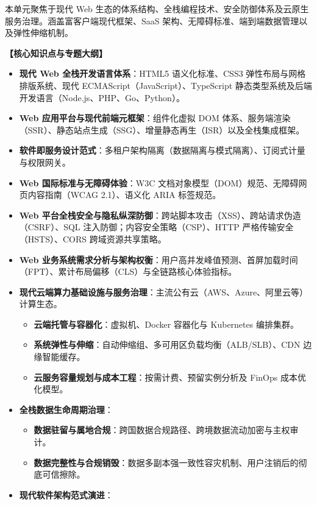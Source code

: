 本单元聚焦于现代 Web 生态的体系结构、全栈编程技术、安全防御体系及云原生服务治理。涵盖富客户端现代框架、SaaS 架构、无障碍标准、端到端数据管理以及弹性伸缩机制。

\textbf{【核心知识点与专题大纲】}
\begin{itemize}
    \item \textbf{现代 Web 全栈开发语言体系}：HTML5 语义化标准、CSS3 弹性布局与网格排版系统、现代 ECMAScript（JavaScript）、TypeScript 静态类型系统及后端开发语言（Node.js、PHP、Go、Python）。
    \item \textbf{Web 应用平台与现代前端元框架}：组件化虚拟 DOM 体系、服务端渲染（SSR）、静态站点生成（SSG）、增量静态再生（ISR）以及全栈集成框架。
    \item \textbf{软件即服务设计范式}：多租户架构隔离（数据隔离与模式隔离）、订阅式计量与权限网关。
    \item \textbf{Web 国际标准与无障碍体验}：W3C 文档对象模型（DOM）规范、无障碍网页内容指南（WCAG 2.1）、语义化 ARIA 标签规范。
    \item \textbf{Web 平台全栈安全与隐私纵深防御}：跨站脚本攻击（XSS）、跨站请求伪造（CSRF）、SQL 注入防御；内容安全策略（CSP）、HTTP 严格传输安全（HSTS）、CORS 跨域资源共享策略。
    \item \textbf{Web 业务系统需求分析与架构权衡}：用户高并发峰值预测、首屏加载时间（FPT）、累计布局偏移（CLS）与全链路核心体验指标。
    \item \textbf{现代云端算力基础设施与服务治理}：主流公有云（AWS、Azure、阿里云等）计算生态。
    \begin{itemize}
        \item \textbf{云端托管与容器化}：虚拟机、Docker 容器化与 Kubernetes 编排集群。
        \item \textbf{系统弹性与伸缩}：自动伸缩组、多可用区负载均衡（ALB/SLB）、CDN 边缘智能缓存。
        \item \textbf{云服务容量规划与成本工程}：按需计费、预留实例分析及 FinOps 成本优化模型。
    \end{itemize}
    \item \textbf{全栈数据生命周期治理}：
    \begin{itemize}
        \item \textbf{数据驻留与属地合规}：跨国数据合规路径、跨境数据流动加密与主权审计。
        \item \textbf{数据完整性与合规销毁}：数据多副本强一致性容灾机制、用户注销后的彻底可信擦除。
    \end{itemize}
    \item \textbf{现代软件架构范式演进}：

\end{itemize}

